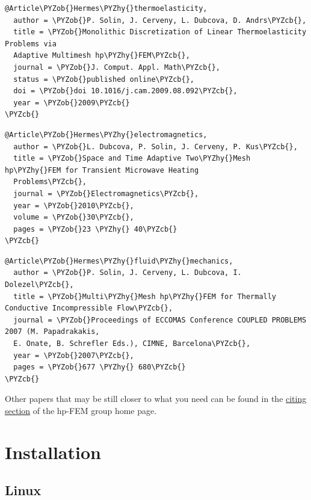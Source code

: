 \documentclass[a4paper,0pt,english]{sphinxmanual}
\def\PYZcb{}
\def\PYZob{}
\def\PYZhy{-}
\begin{document}
\begin{Verbatim}[commandchars=\\\{\}]
@Article\PYZob{}Hermes\PYZhy{}thermoelasticity,
  author = \PYZob{}P. Solin, J. Cerveny, L. Dubcova, D. Andrs\PYZcb{},
  title = \PYZob{}Monolithic Discretization of Linear Thermoelasticity Problems via
  Adaptive Multimesh hp\PYZhy{}FEM\PYZcb{},
  journal = \PYZob{}J. Comput. Appl. Math\PYZcb{},
  status = \PYZob{}published online\PYZcb{},
  doi = \PYZob{}doi 10.1016/j.cam.2009.08.092\PYZcb{},
  year = \PYZob{}2009\PYZcb{}
\PYZcb{}
\end{Verbatim}
\begin{Verbatim}[commandchars=\\\{\}]
@Article\PYZob{}Hermes\PYZhy{}electromagnetics,
  author = \PYZob{}L. Dubcova, P. Solin, J. Cerveny, P. Kus\PYZcb{},
  title = \PYZob{}Space and Time Adaptive Two\PYZhy{}Mesh hp\PYZhy{}FEM for Transient Microwave Heating
  Problems\PYZcb{},
  journal = \PYZob{}Electromagnetics\PYZcb{},
  year = \PYZob{}2010\PYZcb{},
  volume = \PYZob{}30\PYZcb{},
  pages = \PYZob{}23 \PYZhy{} 40\PYZcb{}
\PYZcb{}
\end{Verbatim}
\begin{Verbatim}[commandchars=\\\{\}]
@Article\PYZob{}Hermes\PYZhy{}fluid\PYZhy{}mechanics,
  author = \PYZob{}P. Solin, J. Cerveny, L. Dubcova, I. Dolezel\PYZcb{},
  title = \PYZob{}Multi\PYZhy{}Mesh hp\PYZhy{}FEM for Thermally Conductive Incompressible Flow\PYZcb{},
  journal = \PYZob{}Proceedings of ECCOMAS Conference COUPLED PROBLEMS 2007 (M. Papadrakakis,
  E. Onate, B. Schrefler Eds.), CIMNE, Barcelona\PYZcb{},
  year = \PYZob{}2007\PYZcb{},
  pages = \PYZob{}677 \PYZhy{} 680\PYZcb{}
\PYZcb{}
\end{Verbatim}

Other papers that may be still closer to what you need can be found in the \href{http://www.hpfem.org/citing/}{citing section} of the hp-FEM group home page.


\chapter{Installation}
\label{src/installation:installation}\label{src/installation::doc}

\section{Linux}
\label{src/installation/linux::doc}\label{src/installation/linux:linux}
\end{document}
